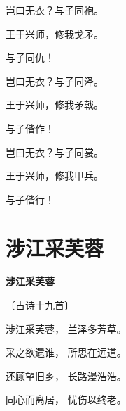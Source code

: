 \documentclass[12pt,UTF-8,openany,fontset=none]{ctexbook}
\begin{document}
\begin{center}
    \begin{Large}

        岂曰无衣？与子同袍。

        王于兴师，修我戈矛。

        与子同仇！\hspace{78pt}

        \vspace{18pt}  %

        岂曰无衣？与子同泽。

        王于兴师，修我矛戟。

        与子偕作！\hspace{78pt}

        \vspace{18pt}  %

        岂曰无衣？与子同裳。

        王于兴师，修我甲兵。

        与子偕行！\hspace{78pt}

    \end{Large}

\end{center}

\vspace{8pt}
\clearpage

\section{涉江采芙蓉}


\begin{center}
    {\bfseries 涉江采芙蓉}

    \vspace{18pt}

    \begin{large}\xuwen
        〔古诗十九首〕
    \end{large}

\end{center}

    \vspace{18pt}  %

\begin{center}
    \begin{Large}

        涉江采芙蓉， 兰泽多芳草。

        采之欲遗谁， 所思在远道。

        还顾望旧乡， 长路漫浩浩。

        同心而离居， 忧伤以终老。

    \end{Large}

\end{center}
\end{document}
